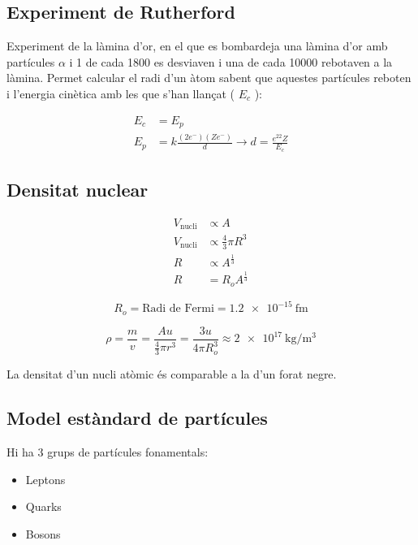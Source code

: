 \subsection{Experiment de Rutherford}
\label{sub:experiment_de_rutherford}

Experiment de la làmina d'or, en el que es bombardeja una làmina d'or amb
partícules $\alpha$ i 1 de cada 1800 es desviaven i una de cada 10000 rebotaven
a la làmina.  Permet calcular el radi d'un àtom sabent que aquestes partícules
reboten i l'energia cinètica amb les que s'han llançat ( $E_c$ ):

\begin{align}
    E_c &= E_p \nonumber \\
    E_p &= k\frac{(2e^-)(Ze^-)}{d} \rightarrow d = \frac{e^22Z}{E_c}
\end{align}

\subsection{Densitat nuclear}
\label{sub:densitat_nuclear}

\begin{align}
    V_{\text{nucli}} &\propto A \\
    V_{\text{nucli}} &\propto \frac{4}{3}\pi R^3 \\
    R &\propto A^{\frac{1}{3}} \\
    R &= R_oA^{\frac{1}{3}}
\end{align}

\begin{equation}
    R_o = \text{Radi de Fermi} = \SI{1,2e-15}{\femto\meter}
\end{equation}

\begin{equation}
    \rho = \frac{m}{v} = \frac{Au}{\frac{4}{3}\pi r^3} = \frac{3u}{4\pi R_o^3} \approx \SI{2e17}{\kilo\gram\per\metre\cubed}
\end{equation}

La densitat d'un nucli atòmic és comparable a la d'un forat negre.

\subsection{Model estàndard de partícules}
\label{sub:model_estandard_de_particules}

Hi ha 3 grups de partícules fonamentals:

\begin{itemize}
    \item Leptons
    \item Quarks
    \item Bosons
\end{itemize}

